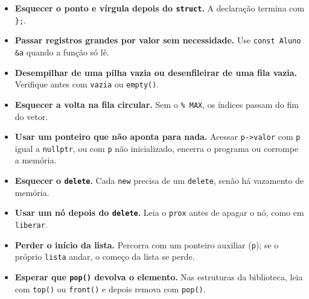 \begin{itemize}
  \item \textbf{Esquecer o ponto e vírgula depois do \texttt{struct}.} A declaração termina com \texttt{\};}.
  \item \textbf{Passar registros grandes por valor sem necessidade.} Use \texttt{const Aluno \&a} quando a função só lê.
  \item \textbf{Desempilhar de uma pilha vazia ou desenfileirar de uma fila vazia.} Verifique antes com \texttt{vazia} ou \texttt{empty()}.
  \item \textbf{Esquecer a volta na fila circular.} Sem o \texttt{\% MAX}, os índices passam do fim do vetor.
  \item \textbf{Usar um ponteiro que não aponta para nada.} Acessar \texttt{p->valor} com \texttt{p} igual a \texttt{nullptr}, ou com \texttt{p} não inicializado, encerra o programa ou corrompe a memória.
  \item \textbf{Esquecer o \texttt{delete}.} Cada \texttt{new} precisa de um \texttt{delete}, senão há vazamento de memória.
  \item \textbf{Usar um nó depois do \texttt{delete}.} Leia o \texttt{prox} antes de apagar o nó, como em \texttt{liberar}.
  \item \textbf{Perder o início da lista.} Percorra com um ponteiro auxiliar (\texttt{p}); se o próprio \texttt{lista} andar, o começo da lista se perde.
  \item \textbf{Esperar que \texttt{pop()} devolva o elemento.} Nas estruturas da biblioteca, leia com \texttt{top()} ou \texttt{front()} e depois remova com \texttt{pop()}.
\end{itemize}
